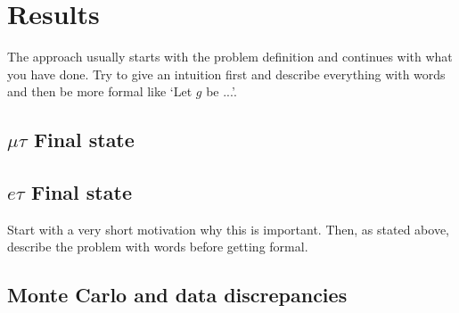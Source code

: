\chapter{Results}\label{chap:approach}
The approach usually starts with the problem definition and continues with what you have done. Try to give an intuition first and describe everything with words and then be more formal like `Let $g$ be ...'.
\section{$\mu\tau$ Final state}
\section{$e\tau$ Final state}
Start with a very short motivation why this is important. Then, as stated above, describe the problem with words before getting formal.

\section{Monte Carlo and data discrepancies}

